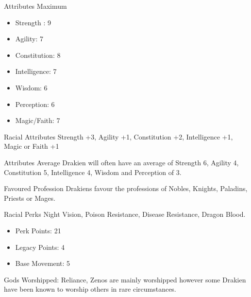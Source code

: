 \begin{multicols}{2}
Attributes Maximum
\begin{itemize}
\item Strength : 9
\item Agility: 7
\item Constitution: 8
\item Intelligence: 7
\item Wisdom: 6
\item Perception: 6
\item Magic/Faith: 7
\end{itemize}

Racial Attributes
Strength +3, Agility +1, Constitution +2, Intelligence +1, Magic or Faith +1

Attributes Average
Drakien will often have an average of Strength 6, Agility 4, Constitution 5, Intelligence 4, Wisdom and Perception of 3.

Favoured Profession
Drakiens favour the professions of Nobles, Knights, Paladins, Priests or Mages.

Racial Perks
Night Vision, Poison Resistance, Disease Resistance, Dragon Blood.
\begin{itemize}
\item Perk Points: 21
\item Legacy Points: 4
\item Base Movement: 5
\end{itemize}

Gods Worshipped: Reliance, Zenos are mainly worshipped however some Drakien have been known to worship others in rare circumstances.
\end{multicols}